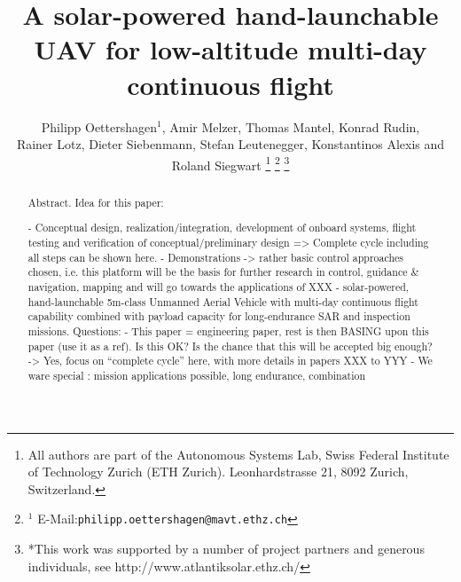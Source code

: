 \documentclass[letterpaper, 10 pt, conference]{ieeeconf}  %
\title{\LARGE \bf A solar-powered hand-launchable UAV for low-altitude multi-day continuous flight}
\author{Philipp Oettershagen$^{1}$, Amir Melzer, Thomas Mantel, Konrad Rudin, \\ Rainer Lotz, Dieter Siebenmann, Stefan Leutenegger, Konstantinos Alexis and Roland Siegwart%
\thanks{All authors are part of the Autonomous Systems Lab, Swiss Federal Institute of Technology Zurich (ETH Zurich). Leonhardstrasse 21, 8092 Zurich, Switzerland. }
\thanks{$^{1}$ E-Mail:{\tt philipp.oettershagen@mavt.ethz.ch}}%
\thanks{*This work was supported by a number of project partners and generous individuals, see http://www.atlantiksolar.ethz.ch/  }%
 }
\begin{document}
\maketitle
\thispagestyle{empty}
\pagestyle{empty}

\begin{abstract}

Abstract. Idea for this paper:

 - Conceptual design, realization/integration, development of onboard systems, flight testing and verification of conceptual/preliminary design => Complete cycle including all steps can be shown here.
   - Demonstrations -> rather basic control approaches chosen, i.e. this platform will be the basis for further research in control, guidance \& navigation, mapping and will go towards the applications of XXX
    - solar-powered, hand-launchable 5m-class Unmanned Aerial Vehicle with multi-day continuous flight capability combined with payload capacity for long-endurance SAR and inspection missions.
Questions:
      - This paper = engineering paper, rest is then BASING upon this paper (use it as a ref). Is this OK? Is the chance that this will be accepted big enough? -> Yes, focus on ``complete cycle'' here, with more details in papers XXX to YYY
 - We ware special : mission applications possible, long endurance, combination
\end{abstract}








\end{document}
